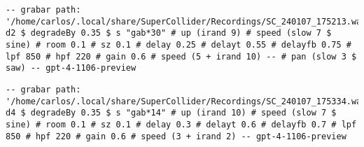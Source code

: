 \begin{minipage}[t]{1\textwidth}
    \centering
    \begin{lstlisting}[style=SuperCollider-IDE, basicstyle=\footnotesize\ttfamily, numbers=none]
-- grabar path: '/home/carlos/.local/share/SuperCollider/Recordings/SC_240107_175213.wav'
d2 $ degradeBy 0.35 $ s "gab*30" # up (irand 9) # speed (slow 7 $ sine) # room 0.1 # sz 0.1 # delay 0.25 # delayt 0.55 # delayfb 0.75 # lpf 850 # hpf 220 # gain 0.6 # speed (5 + irand 10) -- # pan (slow 3 $ saw) -- gpt-4-1106-preview                  
    \end{lstlisting}
    \vspace{1cm}
\end{minipage}











\begin{minipage}[t]{1\textwidth}
    \centering
    \begin{lstlisting}[style=SuperCollider-IDE, basicstyle=\footnotesize\ttfamily, numbers=none]
-- grabar path: '/home/carlos/.local/share/SuperCollider/Recordings/SC_240107_175334.wav'
d4 $ degradeBy 0.35 $ s "gab*14" # up (irand 10) # speed (slow 7 $ sine) # room 0.1 # sz 0.1 # delay 0.3 # delayt 0.6 # delayfb 0.7 # lpf 850 # hpf 220 # gain 0.6 # speed (3 + irand 2) -- gpt-4-1106-preview                         
    \end{lstlisting}
    \vspace{1cm}
\end{minipage}

